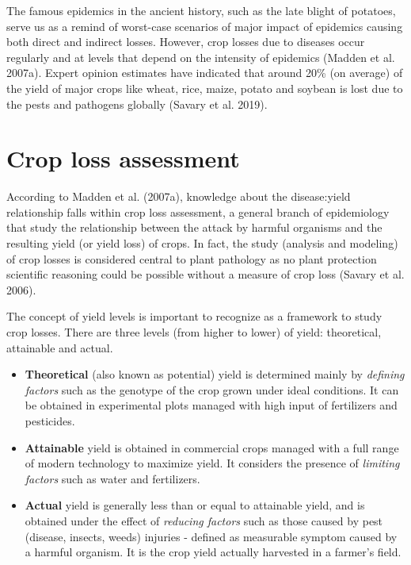 \documentclass[
  letterpaper,
]{book}
\providecommand{\tightlist}{%
  \setlength{\itemsep}{0pt}\setlength{\parskip}{0pt}}\usepackage{longtable,booktabs,array}
\begin{document}
The famous epidemics in the ancient history, such as the late blight of
potatoes, serve us as a remind of worst-case scenarios of major impact
of epidemics causing both direct and indirect losses. However, crop
losses due to diseases occur regularly and at levels that depend on the
intensity of epidemics (Madden et al. 2007a). Expert opinion estimates
have indicated that around 20\% (on average) of the yield of major crops
like wheat, rice, maize, potato and soybean is lost due to the pests and
pathogens globally (Savary et al. 2019).

\hypertarget{crop-loss-assessment}{%
\section{Crop loss assessment}\label{crop-loss-assessment}}

According to Madden et al. (2007a), knowledge about the disease:yield
relationship falls within crop loss assessment, a general branch of
epidemiology that study the relationship between the attack by harmful
organisms and the resulting yield (or yield loss) of crops. In fact, the
study (analysis and modeling) of crop losses is considered central to
plant pathology as no plant protection scientific reasoning could be
possible without a measure of crop loss (Savary et al. 2006).

The concept of yield levels is important to recognize as a framework to
study crop losses. There are three levels (from higher to lower) of
yield: theoretical, attainable and actual.

\begin{itemize}
\tightlist
\item
  \textbf{Theoretical} (also known as potential) yield is determined
  mainly by \emph{defining factors} such as the genotype of the crop
  grown under ideal conditions. It can be obtained in experimental plots
  managed with high input of fertilizers and pesticides.
\item
  \textbf{Attainable} yield is obtained in commercial crops managed with
  a full range of modern technology to maximize yield. It considers the
  presence of \emph{limiting factors} such as water and fertilizers.
\item
  \textbf{Actual} yield is generally less than or equal to attainable
  yield, and is obtained under the effect of \emph{reducing factors}
  such as those caused by pest (disease, insects, weeds) injuries -
  defined as measurable symptom caused by a harmful organism. It is the
  crop yield actually harvested in a farmer's field.
\end{itemize}
\end{document}
